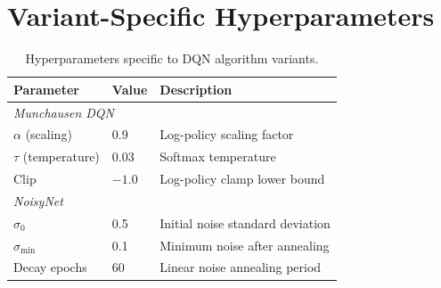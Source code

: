\section{Variant-Specific Hyperparameters}
\label{app:hyper:variants}

\begin{table}[H]
\centering
\caption{Hyperparameters specific to DQN algorithm variants.}
\label{tab:hyper:variants}
\begin{tabular}{l l l}
\toprule
\textbf{Parameter} & \textbf{Value} & \textbf{Description} \\
\midrule
\multicolumn{3}{l}{\textit{Munchausen DQN}} \\
$\alpha$ (scaling)     & 0.9    & Log-policy scaling factor \\
$\tau$ (temperature)   & 0.03   & Softmax temperature \\
Clip                   & $-1.0$ & Log-policy clamp lower bound \\
\midrule
\multicolumn{3}{l}{\textit{NoisyNet}} \\
$\sigma_0$             & 0.5    & Initial noise standard deviation \\
$\sigma_{\min}$        & 0.1    & Minimum noise after annealing \\
Decay epochs           & 60     & Linear noise annealing period \\
\bottomrule
\end{tabular}
\end{table}

